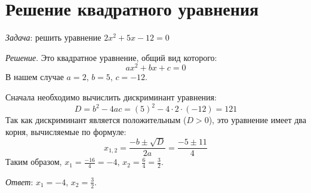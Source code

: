 \documentclass[a4paper,12pt]{extarticle} \usepackage[T2A]{fontenc}
\begin{document}
\section{Решение квадратного уравнения}
\noindent
\textit{Задача}: решить уравнение $2x^2+5x-12=0$

\textit{Решение}. Это квадратное уравнение, общий вид которого:
$$
ax^2+bx+c=0
$$
В нашем случае $a=2$, $b=5$, $c=-12$.

Сначала необходимо вычислить дискриминант уравнения:
$$
D=b^2-4ac=(5)^2-4\cdot 2\cdot (-12)=121
$$
Так как дискриминант является положительным ($D>0$), это уравнение имеет два корня, вычисляемые по формуле:
$$
x_{1,2}=\frac{-b\pm\sqrt{D}}{2a}=\frac{-5\pm11}{4}
$$
Таким образом, $x_1=\frac{-16}{4}=-4$, $x_2=\frac{6}{4}=\frac{3}{2}$.

\textit{Ответ}: $x_1=-4$, $x_2=\frac{3}{2}$.
\end{document}
